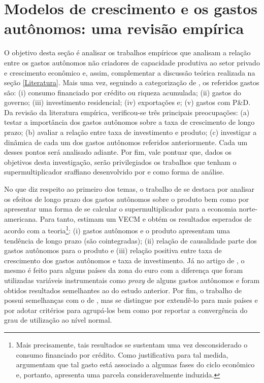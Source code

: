 \section{Modelos de crescimento e os gastos autônomos: uma revisão empírica}
\label{RevF}

O objetivo desta seção é analisar os trabalhos empíricos que analisam a relação entre os gastos autônomos não criadores de capacidade produtiva ao setor privado e crescimento econômico e, assim, complementar a discussão teórica realizada na seção \ref{Literatura}. Mais uma vez, seguindo a categorização de \textcite{cesaratto_technical_2003}, os referidos gastos são:
(i) consumo financiado por crédito ou riqueza acumulada;
(ii) gastos do governo;
(iii) investimento residencial;
(iv) exportações e;
(v) gastos com P\&D. Da revisão da literatura empírica, verificou-se três principais preocupações: 
(a) testar a importância dos gastos autônomos sobre a taxa de crescimento de longo prazo; 
(b) avaliar a relação entre taxa de investimento e produto;
(c) investigar a dinâmica de cada um dos gastos autônomos referidos anteriormente. Cada um desses pontos será analisado adiante. Por fim, vale pontuar que, dados os objetivos desta investigação, serão privilegiados os trabalhos que tenham o supermultiplicador sraffiano desenvolvido por \textcite{serrano_long_1995} e \textcite{bortis_institutions_1996} como forma de análise.

No que diz respeito ao primeiro dos temas, o trabalho de \textcite{girardi_long-run_2016} se destaca por analisar os efeitos de longo prazo dos gastos autônomos sobre o produto bem como por apresentar uma forma de se calcular o supermultiplicador para a economia norte-americana. Para tanto, estimam um VECM e obtém os resultados esperados de acordo com a teoria\footnote{Mais precisamente, tais resultados se sustentam uma vez desconsiderado o consumo financiado por crédito. Como justificativa para tal medida, \textcite[p.~13]{girardi_long-run_2016} argumentam que tal gasto está associado a algumas fases do ciclo econômico e, portanto, apresenta uma parcela consideravelmente induzida.}: (i) gastos autônomos e o produto apresentam uma tendência de longo prazo (são cointegradas); (ii) relação de causalidade parte dos gastos autônomos para o produto e (iii) relação positiva entre taxa de crescimento dos gastos autônomos e taxa de investimento. Já no artigo de \textcite{girardi_autonomous_2018}, o mesmo é feito para alguns países da zona do euro com a diferença que foram utilizadas variáveis instrumentais como \textit{proxy} de alguns gastos autônomos e foram obtidos resultados semelhantes ao do estudo anterior. Por fim, o trabalho de \textcite{goes_supermultiplier_2018} possui semelhanças com o de \textcite{girardi_long-run_2016}, mas se distingue por extendê-lo para mais países e por adotar critérios para agrupá-los bem como por reportar a convergência do grau de utilização ao nível normal.

